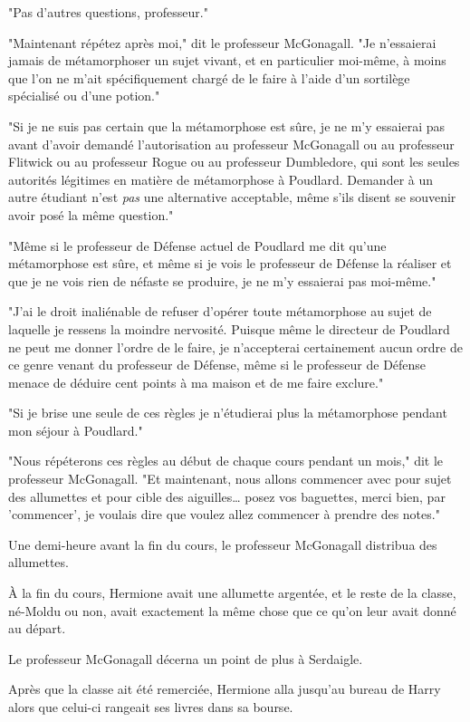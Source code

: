"Pas d'autres questions, professeur."

"Maintenant répétez après moi," dit le professeur McGonagall. "Je n'essaierai jamais de métamorphoser un sujet vivant, et en particulier moi-même, à moins que l'on ne m'ait spécifiquement chargé de le faire à l'aide d'un sortilège spécialisé ou d'une potion."

"Si je ne suis pas certain que la métamorphose est sûre, je ne m'y essaierai pas avant d'avoir demandé l'autorisation au professeur McGonagall ou au professeur Flitwick ou au professeur Rogue ou au professeur Dumbledore, qui sont les seules autorités légitimes en matière de métamorphose à Poudlard. Demander à un autre étudiant n'est \emph{pas} une alternative acceptable, même s'ils disent se souvenir avoir posé la même question."

"Même si le professeur de Défense actuel de Poudlard me dit qu'une métamorphose est sûre, et même si je vois le professeur de Défense la réaliser et que je ne vois rien de néfaste se produire, je ne m'y essaierai pas moi-même."

"J'ai le droit inaliénable de refuser d'opérer toute métamorphose au sujet de laquelle je ressens la moindre nervosité. Puisque même le directeur de Poudlard ne peut me donner l'ordre de le faire, je n'accepterai certainement aucun ordre de ce genre venant du professeur de Défense, même si le professeur de Défense menace de déduire cent points à ma maison et de me faire exclure."

"Si je brise une seule de ces règles je n'étudierai plus la métamorphose pendant mon séjour à Poudlard."

"Nous répéterons ces règles au début de chaque cours pendant un mois," dit le professeur McGonagall. "Et maintenant, nous allons commencer avec pour sujet des allumettes et pour cible des aiguilles… posez vos baguettes, merci bien, par 'commencer', je voulais dire que voulez allez commencer à prendre des notes."

Une demi-heure avant la fin du cours, le professeur McGonagall distribua des allumettes.

À la fin du cours, Hermione avait une allumette argentée, et le reste de la classe, né-Moldu ou non, avait exactement la même chose que ce qu'on leur avait donné au départ.

Le professeur McGonagall décerna un point de plus à Serdaigle.

\later

Après que la classe ait été remerciée, Hermione alla jusqu'au bureau de Harry alors que celui-ci rangeait ses livres dans sa bourse.

